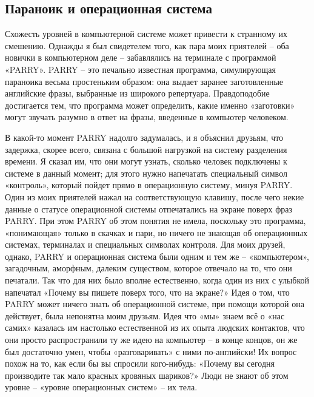 \documentclass[../main.tex]{subfiles}
\begin{document}
\subsection{Параноик и операционная система}

Схожесть уровней в компьютерной системе может привести к странному их смешению. Однажды я был свидетелем того, как пара моих приятелей \--- оба новички в компьютерном деле \--- забавлялись на терминале с программой «PARRY». PARRY \--- это печально известная программа, симулирующая параноика весьма простеньким образом: она выдает заранее заготовленные английские фразы, выбранные из широкого репертуара. Правдоподобие достигается тем, что программа может определить, какие именно «заготовки» могут звучать разумно в ответ на фразы, введенные в компьютер человеком.

В какой-то момент PARRY надолго задумалась, и я объяснил друзьям, что задержка, скорее всего, связана с большой нагрузкой на систему разделения времени. Я сказал им, что они могут узнать, сколько человек подключены к системе в данный момент; для этого нужно напечатать специальный символ «контроль», который пойдет прямо в операционную систему, минуя PARRY\@. Один из моих приятелей нажал на соответствующую клавишу, после чего некие данные о статусе операционной системы отпечатались на экране поверх фраз PARRY\@. При этом PARRY об этом понятия не имела, поскольку это программа, «понимающая» только в скачках и пари, но ничего не знающая об операционных системах, терминалах и специальных символах контроля. Для моих друзей, однако, PARRY и операционная система были одним и тем же \--- «компьютером», загадочным, аморфным, далеким существом, которое отвечало на то, что они печатали. Так что для них было вполне естественно, когда один из них с улыбкой напечатал «Почему вы пишете поверх того, что на экране?» Идея о том, что PARRY может ничего знать об операционной системе, при помощи которой она действует, была непонятна моим друзьям. Идея что «мы» знаем всё о «нас самих» казалась им настолько естественной из их опыта людских контактов, что они просто распространили ту же идею на компьютер \--- в конце концов, он же был достаточно умен, чтобы «разговаривать» с ними по-английски! Их вопрос похож на то, как если бы вы спросили кого-нибудь: «Почему вы сегодня производите так мало красных кровяных шариков?» Люди не знают об этом уровне \--- «уровне операционных систем» \--- их тела.
\end{document}
